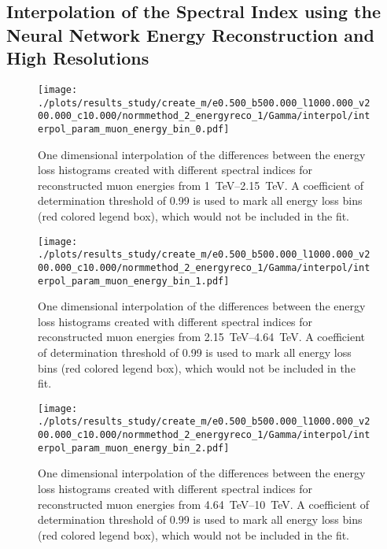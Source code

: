 %

\subsection*{Interpolation of the Spectral Index using the Neural Network Energy Reconstruction and High Resolutions}

\begin{figure}[H]
    \centering
    \texttt{[image: ./plots/results\_study/create\_m/e0.500\_b500.000\_l1000.000\_v200.000\_c10.000/normmethod\_2\_energyreco\_1/Gamma/interpol/interpol\_param\_muon\_energy\_bin\_0.pdf]}
    \caption{One dimensional interpolation of the differences between the energy loss histograms created with different spectral indices for reconstructed muon energies from \SIrange{1}{2.15}{TeV}. A coefficient of determination threshold of \num{0.99} is used to mark all energy loss bins (red colored legend box), which would not be included in the fit.}
    \label{fig:study_1d_interpol_mu0_nn_high_gamma}
\end{figure}

\begin{figure}[H]
    \centering
    \texttt{[image: ./plots/results\_study/create\_m/e0.500\_b500.000\_l1000.000\_v200.000\_c10.000/normmethod\_2\_energyreco\_1/Gamma/interpol/interpol\_param\_muon\_energy\_bin\_1.pdf]}
    \caption{One dimensional interpolation of the differences between the energy loss histograms created with different spectral indices for reconstructed muon energies from \SIrange{2.15}{4.64}{TeV}. A coefficient of determination threshold of \num{0.99} is used to mark all energy loss bins (red colored legend box), which would not be included in the fit.}
    \label{fig:study_1d_interpol_mu1_nn_high_gamma}
\end{figure}

\begin{figure}[H]
    \centering
    \texttt{[image: ./plots/results\_study/create\_m/e0.500\_b500.000\_l1000.000\_v200.000\_c10.000/normmethod\_2\_energyreco\_1/Gamma/interpol/interpol\_param\_muon\_energy\_bin\_2.pdf]}
    \caption{One dimensional interpolation of the differences between the energy loss histograms created with different spectral indices for reconstructed muon energies from \SIrange{4.64}{10}{TeV}. A coefficient of determination threshold of \num{0.99} is used to mark all energy loss bins (red colored legend box), which would not be included in the fit.}
    \label{fig:study_1d_interpol_mu2_nn_high_gamma}
\end{figure}

